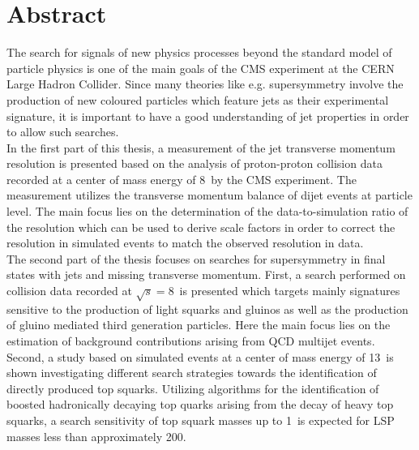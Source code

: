 \section*{Abstract}
The search for signals of new physics processes beyond the standard model of particle physics is one of the main goals of the CMS experiment at the CERN Large Hadron Collider. Since many theories like e.g. supersymmetry involve the production of new coloured particles which feature jets as their experimental signature, it is important to have a good understanding of jet properties in order to allow such searches.\\
In the first part of this thesis, a measurement of the jet transverse momentum resolution is presented based on the analysis of proton-proton collision data recorded at a center of mass energy of 8~\tev by the CMS experiment. The measurement utilizes the transverse momentum balance of dijet events at particle level. The main focus lies on the determination of the data-to-simulation ratio of the resolution which can be used to derive scale factors in order to correct the resolution in simulated events to match the observed resolution in data.\\
The second part of the thesis focuses on searches for supersymmetry in final states with jets and missing transverse momentum. First, a search performed on collision data recorded at $\sqrt{s}=8$~\tev is presented which targets mainly signatures sensitive to the production of light squarks and gluinos as well as the production of gluino mediated third generation particles. Here the main focus lies on the estimation of background contributions arising from QCD multijet events. Second, a study based on simulated events at a center of mass energy of 13~\tev is shown investigating different search strategies towards the identification of directly produced top squarks. Utilizing algorithms for the identification of boosted hadronically decaying top quarks arising from the decay of heavy top squarks, a search sensitivity of top squark masses up to 1~\tev is expected for LSP masses less than approximately 200\gev.   
